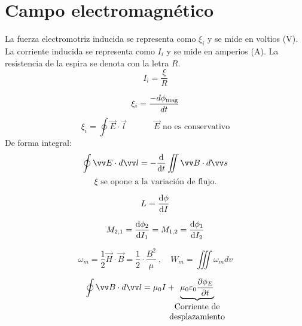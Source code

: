 \documentclass[a4paper]{book}
\begin{document}
\newpage
\section{Campo electromagnético}
\begin{fleqn}
	\begin{multicols}{2}

		\noindent La fuerza electromotriz inducida se representa como $\xi_i$ y se mide en voltios (V). La corriente inducida se representa como $I_i$ y se mide en amperios (A). La resistencia de la espira se denota con la letra $R$.
		\[I_i=\frac{\xi}{R}\]

		\[\xi_i = \frac{-d \phi_{\text{mag}}}{dt}\]
		\[\xi_i=\oint{\vec{E}\cdot \vec{l}}\ \qquad \quad \vec{E} \text{ no es conservativo}\]
		\noindent De forma integral:
		\[\oint{\vec{E}\cdot d\vec{l}}=-\dv{}{t}\iint{\vec{B}\cdot d\vec{s}}\]
		\[\xi \text{ se opone a la variación de flujo.}\]

		\[L=\dv{\phi}{I}\]

		\[M_{2,1}=\dv{\phi_2}{I_1}=M_{1,2}=\dv{\phi_1}{I_2}\]

		\[\omega_m = \frac{1}{2}\vec{H}\cdot \vec{B}= \frac{1}{2}\cdot \frac{B^2}{\mu} \ , \quad W_m=\iiint \omega_m dv\]

		\[\oint{\vec{B}\cdot d\vec{l}} = \mu _0I+\!\!\!\!\!\underbrace{\mu_0\varepsilon_0\pdv{\phi_E}{t}}_{ \begin{matrix}
					\text{Corriente de} \\
					\text{desplazamiento}
				\end{matrix}}\]

	\end{multicols}
\end{fleqn}

% 
\end{document}
